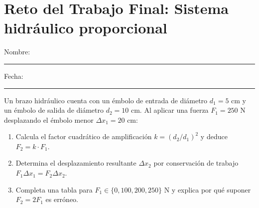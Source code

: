 \documentclass[spanish,letterpaper,oneside]{article}
\begin{document}
\templatePortrait\templatePagecfg\templateFinalcfg\fancyfoot{}\fancyfoot[C]{\scriptsize\thepage}\raggedbottom

\section*{Reto del Trabajo Final: Sistema hidráulico proporcional}
Nombre: \rule{8cm}{.2pt}\hfill Fecha: \rule{2.5cm}{.2pt}

Un brazo hidráulico cuenta con un émbolo de entrada de diámetro $d_1 = 5\text{ cm}$ y un émbolo de salida de diámetro $d_2 = 10\text{ cm}$. Al aplicar una fuerza $F_1 = 250\text{ N}$ desplazando el émbolo menor $\Delta x_1 = 20\text{ cm}$:
\begin{enumerate}
  \item Calcula el factor cuadrático de amplificación $k = (d_2/d_1)^2$ y deduce $F_2 = k\cdot F_1$.
  \item Determina el desplazamiento resultante $\Delta x_2$ por conservación de trabajo $F_1\Delta x_1 = F_2\Delta x_2$.
  \item Completa una tabla para $F_1 \in \{0, 100, 200, 250\}\text{ N}$ y explica por qué suponer $F_2 = 2 F_1$ es erróneo.
\end{enumerate}
\vspace{3.5cm}
\end{document}
